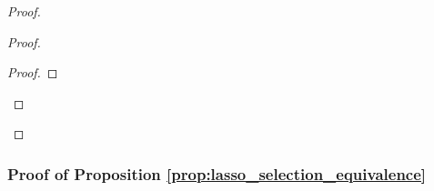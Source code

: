 \begin{proof}
\begin{proof}
\begin{proof}






\end{proof}
\end{proof}

\end{proof}
\subsubsection{Proof of Proposition \ref{prop:lasso_selection_equivalence} }

